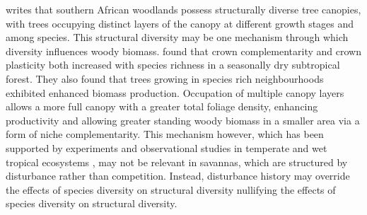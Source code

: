 \documentclass[11pt,a4paper]{article}
\begin{document}


\citet{Solbrig1996} writes that southern African woodlands possess structurally diverse tree canopies, with trees occupying distinct layers of the canopy at different growth stages and among species. This structural diversity may be one mechanism through which diversity influences woody biomass. \citep{Kunz2019} found that crown complementarity and crown plasticity both increased with species richness in a seasonally dry subtropical forest. They also found that trees growing in species rich neighbourhoods exhibited enhanced biomass production. Occupation of multiple canopy layers allows a more full canopy with a greater total foliage density, enhancing productivity and allowing greater standing woody biomass in a smaller area via a form of niche complementarity. This mechanism however, which has been supported by experiments and observational studies in temperate and wet tropical ecosystems \citep{Hardiman2011, Stark2012}, may not be relevant in savannas, which are structured by disturbance rather than competition. Instead, disturbance history may override the effects of species diversity on structural diversity nullifying the effects of species diversity on structural diversity. 

\end{document}
